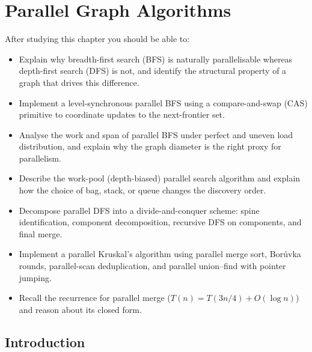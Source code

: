

\chapter{Parallel Graph Algorithms}

\begin{ppkey}
After studying this chapter you should be able to:
\begin{itemize}
  \item Explain why breadth-first search (BFS) is naturally parallelisable
        whereas depth-first search (DFS) is not, and identify the structural
        property of a graph that drives this difference.
  \item Implement a level-synchronous parallel BFS using a compare-and-swap
        (CAS) primitive to coordinate updates to the next-frontier set.
  \item Analyse the work and span of parallel BFS under perfect and uneven
        load distribution, and explain why the graph diameter is the right
        proxy for parallelism.
  \item Describe the work-pool (depth-biased) parallel search algorithm and
        explain how the choice of bag, stack, or queue changes the discovery
        order.
  \item Decompose parallel DFS into a divide-and-conquer scheme: spine
        identification, component decomposition, recursive DFS on
        components, and final merge.
  \item Implement a parallel Kruskal's algorithm using parallel merge sort,
        Bor\r{u}vka rounds, parallel-scan deduplication, and parallel
        union--find with pointer jumping.
  \item Recall the recurrence for parallel merge ($T(n) = T(3n/4) + O(\log n)$)
        and reason about its closed form.
\end{itemize}
\end{ppkey}

\section{Introduction}

